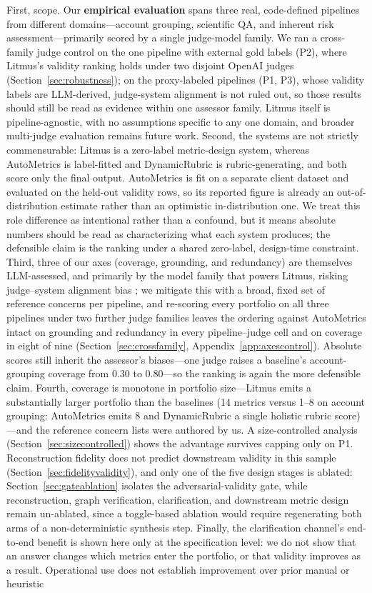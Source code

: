 \documentclass[11pt]{article}
\begin{document}
First, scope. Our \textbf{empirical evaluation} spans three real, code-defined pipelines from different domains---account grouping, scientific QA, and inherent risk assessment---primarily scored by a single judge-model family. We ran a cross-family judge control on the one pipeline with external gold labels (P2), where Litmus's validity ranking holds under two disjoint OpenAI judges (Section~\ref{sec:robustness}); on the proxy-labeled pipelines (P1, P3), whose validity labels are LLM-derived, judge-system alignment is not ruled out, so those results should still be read as evidence within one assessor family. Litmus itself is pipeline-agnostic, with no assumptions specific to any one domain, and broader multi-judge evaluation remains future work. Second, the systems are not strictly commensurable: Litmus is a zero-label metric-design system, whereas AutoMetrics is label-fitted and DynamicRubric is rubric-generating, and both score only the final output. AutoMetrics is fit on a separate client dataset and evaluated on the held-out validity rows, so its reported figure is already an out-of-distribution estimate rather than an optimistic in-distribution one. We treat this role difference as intentional rather than a confound, but it means absolute numbers should be read as characterizing what each system produces; the defensible claim is the ranking under a shared zero-label, design-time constraint. Third, three of our axes (coverage, grounding, and redundancy) are themselves LLM-assessed, and primarily by the model family that powers Litmus, risking judge--system alignment bias \citep{zheng2023judging,panickssery2024llm}; we mitigate this with a broad, fixed set of reference concerns per pipeline, and re-scoring every portfolio on all three pipelines under two further judge families leaves the ordering against AutoMetrics intact on grounding and redundancy in every pipeline--judge cell and on coverage in eight of nine (Section~\ref{sec:crossfamily}, Appendix~\ref{app:axescontrol}). Absolute scores still inherit the assessor's biases---one judge raises a baseline's account-grouping coverage from $0.30$ to $0.80$---so the ranking is again the more defensible claim. Fourth, coverage is monotone in portfolio size---Litmus emits a substantially larger portfolio than the baselines (14 metrics versus 1--8 on account grouping: AutoMetrics emits 8 and DynamicRubric a single holistic rubric score)---and the reference concern lists were authored by us. A size-controlled analysis (Section~\ref{sec:sizecontrolled}) shows the advantage survives capping only on P1. Reconstruction fidelity does not predict downstream validity in this sample (Section~\ref{sec:fidelityvalidity}), and only one of the five design stages is ablated: Section~\ref{sec:gateablation} isolates the adversarial-validity gate, while reconstruction, graph verification, clarification, and downstream metric design remain un-ablated, since a toggle-based ablation would require regenerating both arms of a non-deterministic synthesis step. Finally, the clarification channel's end-to-end benefit is shown here only at the specification level: we do not show that an answer changes which metrics enter the portfolio, or that validity improves as a result. Operational use does not establish improvement over prior manual or heuristic 
\end{document}
